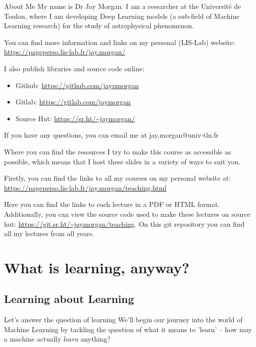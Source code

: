 \documentclass[10pt]{beamer}
\begin{document}
\begin{frame}[label={sec:org3554ed8}]{About Me}
My name is Dr Jay Morgan. I am a researcher at the Université de Toulon, where I am
developing Deep Learning models (a sub-field of Machine Learning research) for the
study of astrophysical phenomenon.

You can find more information and links on my personal (LIS-Lab) website:
\url{https://pageperso.lis-lab.fr/jay.morgan/}

I also publish libraries and source code online:
\begin{itemize}
\item Github: \url{https://github.com/jaypmorgan}
\item Gitlab: \url{https://gitlab.com/jaymorgan}
\item Source Hut: \url{https://sr.ht/\~jaymorgan/}
\end{itemize}

If you have any questions, you can email me at jay.morgan@univ-tln.fr
\end{frame}

\begin{frame}[label={sec:orgb0572f7}]{Where you can find the resources}
I try to make this course as accessible as possible, which means that I host these
slides in a variety of ways to suit you.

Firstly, you can find the links to all my courses on my personal website at:
\url{https://pageperso.lis-lab.fr/jay.morgan/teaching.html}

Here you can find the links to each lecture in a PDF or HTML format. Additionally,
you can view the source code used to make these lectures on source hut:
\url{https://git.sr.ht/\~jaymorgan/teaching}. On this git repository you can find all my
lectures from all years.
\end{frame}

\section*{What is learning, anyway?}
\label{sec:org5b2904a}

\subsection*{Learning about Learning}
\label{sec:orgc1af7a3}

\begin{frame}[label={sec:orged7df74}]{Let's answer the question of learning}
We'll begin our journey into the world of Machine Learning by tackling the question
of what it means to 'learn' -- how may a machine actually \emph{learn} anything?
\end{frame}
\end{document}
